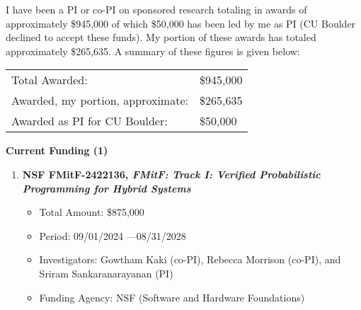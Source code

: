 \documentclass{article}
\begin{document}
\vspace{1em}
\noindent I have been a PI or co-PI on sponsored research totaling in
awards of approximately \$945,000 of which \$50,000 has been led by me as
PI (CU Boulder declined to accept these funds). My portion of these awards
has totaled approximately \$265,635. A summary of these figures is given
below:

\vspace{1em}
\begin{tabular}{p{8cm}  l}
  Total Awarded: &  \$945,000\\
  Awarded, my portion, approximate:& \$265,635 \\
  Awarded as PI for CU Boulder:& \$50,000  
\end{tabular}

\medskip

\noindent\textbf{Current Funding (1)}

\begin{enumerate}

\item {\bf NSF FMitF-2422136, \emph{FMitF: Track I: Verified Probabilistic Programming for Hybrid Systems}}
\begin{itemize}
  \item 
    Total Amount: \$875,000
  \item 
    Period: 09/01/2024 ---08/31/2028
\item 
    Investigators: Gowtham Kaki (co-PI), Rebecca Morrison (co-PI), and
    Sriram Sankaranarayanan (PI)
\item 
Funding Agency: NSF (Software and Hardware Foundations)
\end{itemize}  
\end{enumerate}

\medskip
\end{document}

